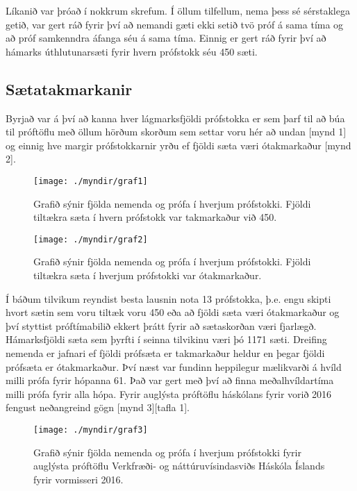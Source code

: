 \documentclass[12pt]{article}
\begin{document}
Líkanið var þróað í nokkrum skrefum. Í öllum tilfellum, nema þess sé sérstaklega getið, var gert ráð fyrir því að nemandi gæti ekki setið tvö próf á sama tíma og að próf samkenndra áfanga séu á sama tíma. Einnig er gert ráð fyrir því að hámarks úthlutunarsæti fyrir hvern prófstokk séu 450 sæti.

\subsection{Sætatakmarkanir}

Byrjað var á því að kanna hver lágmarksfjöldi prófstokka er sem þarf til að búa til próftöflu með öllum hörðum skorðum sem settar voru hér að undan [mynd 1] og einnig hve margir prófstokkarnir yrðu ef fjöldi sæta væri ótakmarkaður [mynd 2]. 


\begin{figure}[h]
\centering
\texttt{[image: ./myndir/graf1]}
\caption{Grafið sýnir fjölda nemenda og prófa í hverjum prófstokki. Fjöldi tiltækra sæta í hvern prófstokk var takmarkaður við 450.}
\end{figure}

\newpage

\begin{figure}[h]
    \centering
    \texttt{[image: ./myndir/graf2]}
    \caption{Grafið sýnir fjölda nemenda og prófa í hverjum prófstokki. Fjöldi tiltækra sæta í hverjum prófstokki var ótakmarkaður.}
\end{figure}


Í báðum tilvikum reyndist besta lausnin nota 13 prófstokka, þ.e. engu skipti hvort sætin sem voru tiltæk voru 450 eða að fjöldi sæta væri ótakmarkaður og því styttist próftímabilið ekkert þrátt fyrir að sætaskorðan væri fjarlægð. Hámarksfjöldi sæta sem þyrfti í seinna tilvikinu væri þó 1171 sæti. Dreifing nemenda er jafnari ef fjöldi prófsæta er takmarkaður heldur en þegar fjöldi prófsæta er ótakmarkaður. 
Því næst var fundinn heppilegur mælikvarði á hvíld milli prófa fyrir hópanna 61. Það var gert með því að finna meðalhvíldartíma milli prófa fyrir alla hópa. Fyrir auglýsta próftöflu háskólans fyrir vorið 2016 fengust neðangreind gögn  [mynd 3][tafla 1].


\begin{figure}[h]
    \centering
    \texttt{[image: ./myndir/graf3]}
    \caption{Grafið sýnir fjölda nemenda og prófa í hverjum prófstokki fyrir auglýsta próftöflu Verkfræði- og náttúruvísindasviðs Háskóla Íslands fyrir vormisseri 2016.}
\end{figure}
\end{document}
